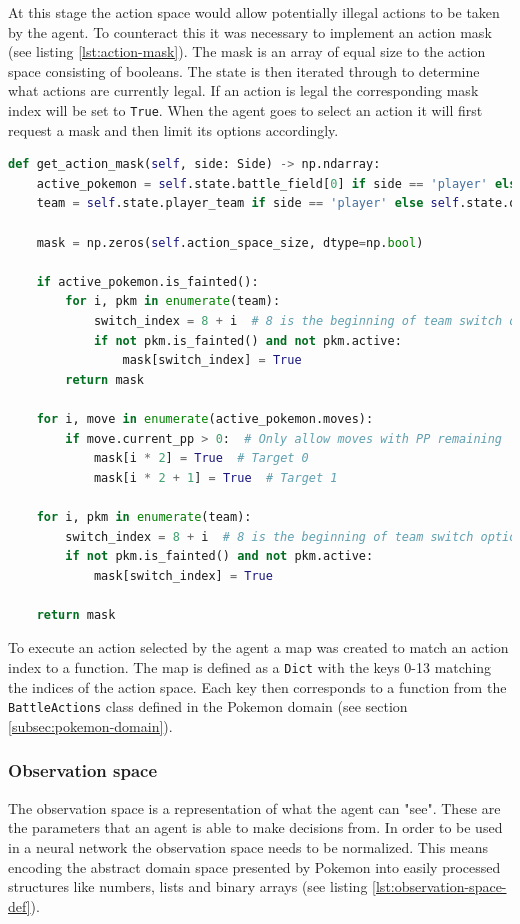 At this stage the action space would allow potentially illegal actions to be taken by the agent. To counteract this it was
necessary to implement an action mask (see listing \ref{lst:action-mask}). The mask is an array of equal size to the action space
consisting of booleans. The state is then iterated through to determine what actions are currently legal. If an action is legal
the corresponding mask index will be set to \lstinline|True|. When the agent goes to select an action it will first request
a mask and then limit its options accordingly.

\begin{lstlisting}[basicstyle=\fontsize{10}{10}\selectfont\ttfamily,language=Python,caption={The action mask that makes sure only valid actions are being evaluated.},label=lst:action-mask,breaklines]
def get_action_mask(self, side: Side) -> np.ndarray:
    active_pokemon = self.state.battle_field[0] if side == 'player' else self.state.battle_field[1]
    team = self.state.player_team if side == 'player' else self.state.opponent_team

    mask = np.zeros(self.action_space_size, dtype=np.bool)

    if active_pokemon.is_fainted():
        for i, pkm in enumerate(team):
            switch_index = 8 + i  # 8 is the beginning of team switch options
            if not pkm.is_fainted() and not pkm.active:
                mask[switch_index] = True
        return mask

    for i, move in enumerate(active_pokemon.moves):
        if move.current_pp > 0:  # Only allow moves with PP remaining
            mask[i * 2] = True  # Target 0
            mask[i * 2 + 1] = True  # Target 1

    for i, pkm in enumerate(team):
        switch_index = 8 + i  # 8 is the beginning of team switch options
        if not pkm.is_fainted() and not pkm.active:
            mask[switch_index] = True

    return mask
\end{lstlisting}

To execute an action selected by the agent a map was created to match an action index to a function. The map is defined as a \lstinline|Dict| with the keys
0-13 matching the indices of the action space. Each key then corresponds to a function from the \lstinline|BattleActions|
class defined in the Pokemon domain (see section \ref{subsec:pokemon-domain}).

\subsubsection{Observation space}
The observation space is a representation of what the agent can "see". These are the parameters that an agent is able to make
decisions from. In order to be used in a neural network the observation space needs to be normalized. This means encoding the
abstract domain space presented by Pokemon into easily processed structures like numbers, lists and binary arrays (see listing \ref{lst:observation-space-def}).


